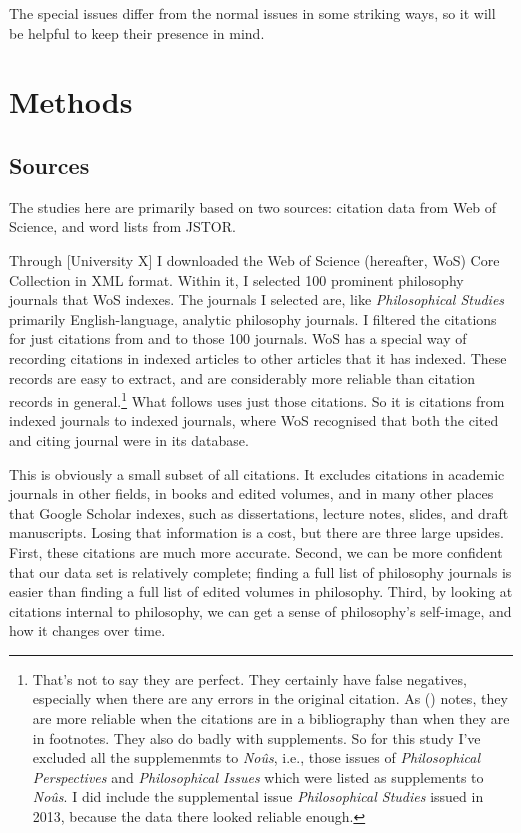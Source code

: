 \documentclass[
  10pt,
  letterpaper,
  DIV=11,
  numbers=noendperiod,
  twoside]{scrartcl}
\begin{document}
The special issues differ from the normal issues in some striking ways,
so it will be helpful to keep their presence in mind.

\section{Methods}\label{sec-methods}

\subsection{Sources}\label{sec-sources}

The studies here are primarily based on two sources: citation data from
Web of Science, and word lists from JSTOR.

Through {[}University X{]} I downloaded the Web of Science (hereafter,
WoS) Core Collection in XML format. Within it, I selected 100 prominent
philosophy journals that WoS indexes. The journals I selected are, like
\emph{Philosophical Studies} primarily English-language, analytic
philosophy journals. I filtered the citations for just citations from
and to those 100 journals. WoS has a special way of recording citations
in indexed articles to other articles that it has indexed. These records
are easy to extract, and are considerably more reliable than citation
records in general.\footnote{That's not to say they are perfect. They
  certainly have false negatives, especially when there are any errors
  in the original citation. As
  () notes, they
  are more reliable when the citations are in a bibliography than when
  they are in footnotes. They also do badly with supplements. So for
  this study I've excluded all the supplemenmts to \emph{Noûs}, i.e.,
  those issues of \emph{Philosophical Perspectives} and
  \emph{Philosophical Issues} which were listed as supplements to
  \emph{Noûs}. I did include the supplemental issue \emph{Philosophical
  Studies} issued in 2013, because the data there looked reliable
  enough.} What follows uses just those citations. So it is citations
from indexed journals to indexed journals, where WoS recognised that
both the cited and citing journal were in its database.

This is obviously a small subset of all citations. It excludes citations
in academic journals in other fields, in books and edited volumes, and
in many other places that Google Scholar indexes, such as dissertations,
lecture notes, slides, and draft manuscripts. Losing that information is
a cost, but there are three large upsides. First, these citations are
much more accurate. Second, we can be more confident that our data set
is relatively complete; finding a full list of philosophy journals is
easier than finding a full list of edited volumes in philosophy. Third,
by looking at citations internal to philosophy, we can get a sense of
philosophy's self-image, and how it changes over time.
\end{document}
